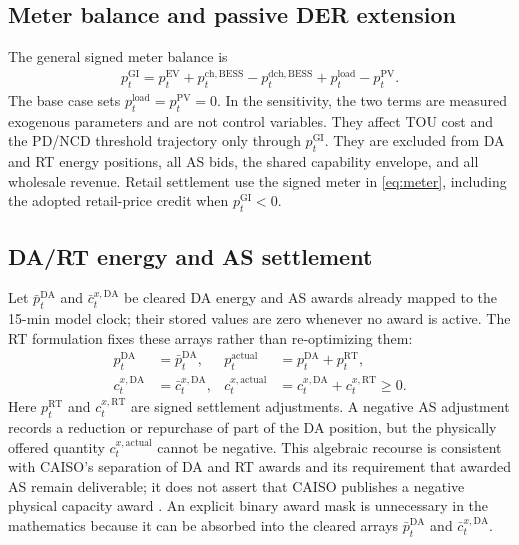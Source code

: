 \documentclass[final,5p,times]{elsarticle}
\newcommand{\EV}{\mathrm{EV}}
\newcommand{\BESS}{\mathrm{BESS}}
\newcommand{\DA}{\mathrm{DA}}
\newcommand{\RT}{\mathrm{RT}}
\newcommand{\GI}{\mathrm{GI}}
\newcommand{\PV}{\mathrm{PV}}
\newcommand{\ch}{\mathrm{ch}}
\newcommand{\dch}{\mathrm{dch}}
\newcommand{\actual}{\mathrm{actual}}
\newcommand{\load}{\mathrm{load}}
\begin{document}
\subsection{Meter balance and passive DER extension}
\label{sec:passive_der}
The general signed meter balance is
\begin{align}
p_t^{\GI}
=p_t^{\EV}+p_t^{\ch,\BESS}-p_t^{\dch,\BESS}
+p_t^{\load}-p_t^{\PV}. \label{eq:meter}
\end{align}
The base case sets $p_t^{\load}=p_t^{\PV}=0$. In the sensitivity, the two terms are measured exogenous parameters and are not control variables. They affect TOU cost and the PD/NCD threshold trajectory only through $p_t^{\GI}$. They are excluded from DA and RT energy positions, all AS bids, the shared capability envelope, and all wholesale revenue. Retail settlement use the signed meter in \eqref{eq:meter}, including the adopted retail-price credit when $p_t^{\GI}<0$.

\subsection{DA/RT energy and AS settlement}
Let $\bar p_t^{\DA}$ and $\bar c_t^{x,\DA}$ be cleared DA energy and AS awards
already mapped to the 15-min model clock; their stored values are zero whenever
no award is active. The RT formulation fixes these arrays rather than
re-optimizing them:
\begin{align}
p_t^{\DA}&=\bar p_t^{\DA},&
p_t^{\actual}&=p_t^{\DA}+p_t^{\RT}, \label{eq:actual_energy}\\
c_t^{x,\DA}&=\bar c_t^{x,\DA},&
c_t^{x,\actual}&=c_t^{x,\DA}+c_t^{x,\RT}\ge0. \label{eq:actual_as}
\end{align}
Here $p_t^{\RT}$ and $c_t^{x,\RT}$ are signed settlement adjustments. A
negative AS adjustment records a reduction or repurchase of part of the DA
position, but the physically offered quantity $c_t^{x,\actual}$ cannot be
negative. This algebraic recourse is consistent with CAISO's separation of DA
and RT awards and its requirement that awarded AS remain deliverable; it does
not assert that CAISO publishes a negative physical capacity award
\cite{caisoMarketOperations2026} \cite{caisoNGRCommitment2020}. An explicit binary
award mask is unnecessary in the mathematics because it can be absorbed into
the cleared arrays $\bar p_t^{\DA}$ and $\bar c_t^{x,\DA}$.
\end{document}
